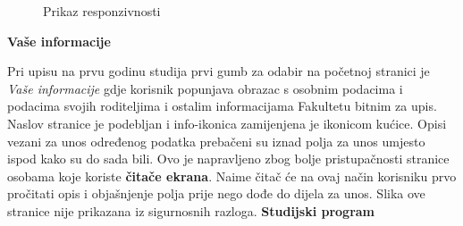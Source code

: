 \documentclass[times, utf8, zavrsni, numeric]{fer}
\begin{document}
        \begin{figure} [H]
          \centering
          \caption{Prikaz responzivnosti}
        \end{figure}
        
        \vspace{\baselineskip}
        \bigbreak
        \noindent\textbf{Vaše informacije}
        
        Pri upisu na prvu godinu studija prvi gumb za odabir na početnoj stranici je \textit{Vaše informacije} gdje korisnik popunjava obrazac s osobnim podacima i podacima svojih roditeljima i ostalim informacijama Fakultetu bitnim za upis. Naslov stranice je podebljan i info-ikonica zamijenjena je ikonicom kućice. Opisi vezani za unos određenog podatka prebačeni su iznad polja za unos umjesto ispod kako su do sada bili. Ovo je napravljeno zbog bolje pristupačnosti stranice osobama koje koriste \textbf{čitače ekrana}. Naime čitač će na ovaj način korisniku prvo pročitati opis i objašnjenje polja prije nego dođe do dijela za unos. Slika ove stranice nije prikazana iz sigurnosnih razloga.
        \linebreak\linebreak
        \noindent\textbf{Studijski program}
        
\end{document}
